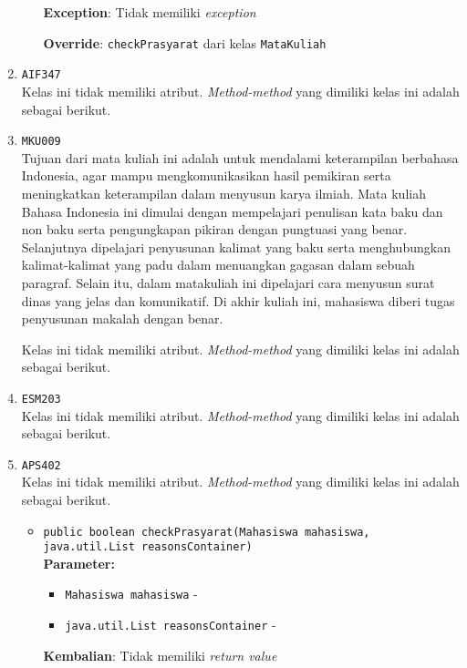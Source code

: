 \documentclass{article}
\begin{document}
\begin{enumerate}
\begin{itemize}
\textbf{Exception}: Tidak memiliki \textit{exception}

\textbf{Override}: \texttt{checkPrasyarat} dari kelas \texttt{MataKuliah}

\end{itemize}
\item \texttt{AIF347}\\ 
Kelas ini tidak memiliki atribut. \textit{Method-method} yang dimiliki kelas ini adalah sebagai berikut.
\begin{itemize}
\end{itemize}
\item \texttt{MKU009}\\ 
Tujuan dari mata kuliah ini adalah untuk mendalami keterampilan berbahasa Indonesia, agar 
 mampu mengkomunikasikan hasil pemikiran serta meningkatkan keterampilan dalam menyusun karya
 ilmiah. Mata kuliah Bahasa Indonesia ini dimulai dengan mempelajari penulisan kata baku dan 
 non baku serta pengungkapan pikiran dengan pungtuasi yang benar. Selanjutnya dipelajari 
 penyusunan kalimat yang baku serta menghubungkan kalimat-kalimat yang padu dalam menuangkan 
 gagasan dalam sebuah paragraf. Selain itu, dalam matakuliah ini dipelajari cara menyusun
 surat dinas yang jelas dan komunikatif. Di akhir kuliah ini, mahasiswa diberi tugas
 penyusunan makalah dengan benar.

Kelas ini tidak memiliki atribut. \textit{Method-method} yang dimiliki kelas ini adalah sebagai berikut.
\begin{itemize}
\end{itemize}
\item \texttt{ESM203}\\ 
Kelas ini tidak memiliki atribut. \textit{Method-method} yang dimiliki kelas ini adalah sebagai berikut.
\begin{itemize}
\end{itemize}
\item \texttt{APS402}\\ 
Kelas ini tidak memiliki atribut. \textit{Method-method} yang dimiliki kelas ini adalah sebagai berikut.
\begin{itemize}
\item \texttt{public boolean checkPrasyarat(Mahasiswa mahasiswa, java.util.List reasonsContainer)}\\ 


\textbf{Parameter:}\begin{itemize}
\item \texttt{Mahasiswa mahasiswa} - 
\item \texttt{java.util.List reasonsContainer} - 
\end{itemize}
\textbf{Kembalian}: Tidak memiliki \textit{return value}


\end{itemize}
\end{enumerate}
\end{document}

